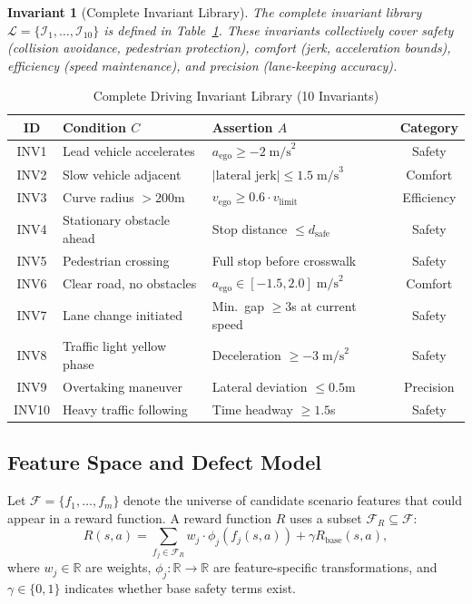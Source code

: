 \documentclass[journal]{IEEEtran}
\theoremstyle{plain}
\newtheorem{invariant}{Invariant}[section]
\theoremstyle{definition}
\theoremstyle{remark}
\newcommand{\invlib}{\mathcal{L}}
\newcommand{\feat}{\mathcal{F}}
\newcommand{\R}{\mathbb{R}}
\begin{document}
\begin{invariant}[Complete Invariant Library]\label{inv:library}
The complete invariant library $\invlib = \{\mathcal{I}_1,\dots,\mathcal{I}_{10}\}$ is defined in Table~\ref{tab:invariants}. These invariants collectively cover safety (collision avoidance, pedestrian protection), comfort (jerk, acceleration bounds), efficiency (speed maintenance), and precision (lane-keeping accuracy).
\end{invariant}

\begin{table}[t]
\centering
\caption{Complete Driving Invariant Library (10 Invariants)}
\label{tab:invariants}
\small
\begin{tabular}{cp{2.5cm}p{3.2cm}c}
\toprule
\textbf{ID} & \textbf{Condition $C$} & \textbf{Assertion $A$} & \textbf{Category}\\\midrule
INV1 & Lead vehicle accelerates & $a_{\text{ego}} \geq -2\;\text{m/s}^2$ & Safety\\
INV2 & Slow vehicle adjacent & $|\text{lateral jerk}| \leq 1.5\;\text{m/s}^3$ & Comfort\\
INV3 & Curve radius $>200$m & $v_{\text{ego}} \geq 0.6\cdot v_{\text{limit}}$ & Efficiency\\
INV4 & Stationary obstacle ahead & Stop distance $\leq d_{\text{safe}}$ & Safety\\
INV5 & Pedestrian crossing & Full stop before crosswalk & Safety\\
INV6 & Clear road, no obstacles & $a_{\text{ego}} \in [-1.5, 2.0]\;\text{m/s}^2$ & Comfort\\
INV7 & Lane change initiated & Min.\ gap $\geq 3$s at current speed & Safety\\
INV8 & Traffic light yellow phase & Deceleration $\geq -3\;\text{m/s}^2$ & Safety\\
INV9 & Overtaking maneuver & Lateral deviation $\leq 0.5$m & Precision\\
INV10 & Heavy traffic following & Time headway $\geq 1.5$s & Safety\\
\bottomrule
\end{tabular}
\end{table}

\subsection{Feature Space and Defect Model}

Let $\feat = \{f_1,\dots,f_m\}$ denote the universe of candidate scenario features that could appear in a reward function. A reward function $R$ uses a subset $\feat_R \subseteq \feat$:
\begin{equation}
R(s,a) = \sum_{f_j \in \feat_R} w_j \cdot \phi_j(f_j(s,a)) + \gamma R_{\text{base}}(s,a),
\label{eq:reward}
\end{equation}
where $w_j \in \R$ are weights, $\phi_j: \R \to \R$ are feature-specific transformations, and $\gamma \in \{0,1\}$ indicates whether base safety terms exist.
\end{document}
